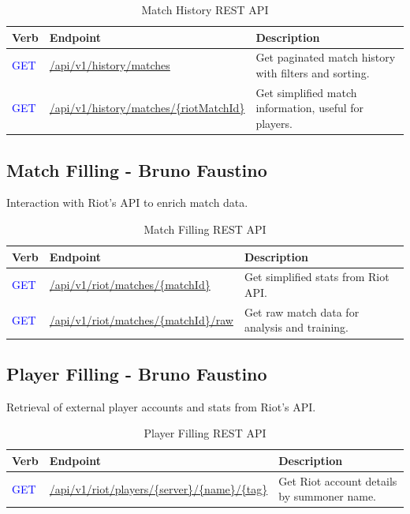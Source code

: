 \documentclass[11pt,a4paper]{article}
\newcommand{\getapi}{\textcolor{blue}{GET}}
\newcommand{\history}[1]{/api/v1/history#1}
\newcommand{\riot}[1]{/api/v1/riot#1}
\newcommand{\bff}[1]{\textbf{#1}}
\begin{document}
 \begin{table}[H]
 \begin{tabular}{|p{2cm}|p{5cm}|p{7cm}|}
 \hline
 \bff{Verb} & \bff{Endpoint}       & \bff{Description} \\ \hline
 \getapi & \url{\history{/matches}}    & Get paginated match history with filters and sorting. \\ \hline
 \getapi & \url{\history{/matches/{riotMatchId}}} & Get simplified match information, useful for players. \\ \hline
 \end{tabular}
 \caption{Match History REST API}
 \label{tab:api-match-history}
 \end{table}

 \subsection{Match Filling - Bruno Faustino}

 Interaction with Riot's API to enrich match data.

 \begin{table}[H]
 \begin{tabular}{|p{2cm}|p{5cm}|p{7cm}|}
 \hline
 \bff{Verb} & \bff{Endpoint}       & \bff{Description} \\ \hline
 \getapi & \url{\riot{/matches/{matchId}}}  & Get simplified stats from Riot API. \\ \hline
 \getapi & \url{\riot{/matches/{matchId}/raw}} & Get raw match data for analysis and training. \\ \hline
 \end{tabular}
 \caption{Match Filling REST API}
 \label{tab:api-match-filling}
 \end{table}

 \subsection{Player Filling - Bruno Faustino}

 Retrieval of external player accounts and stats from Riot's API.

 \begin{table}[H]
 \begin{tabular}{|p{2cm}|p{5cm}|p{7cm}|}
 \hline
 \bff{Verb} & \bff{Endpoint}         & \bff{Description} \\ \hline
 \getapi & \url{\riot{/players/{server}/{name}/{tag}}} & Get Riot account details by summoner name. \\ \hline
 \end{tabular}
 \caption{Player Filling REST API}
 \label{tab:api-player-filling}
 \end{table}
\end{document}
